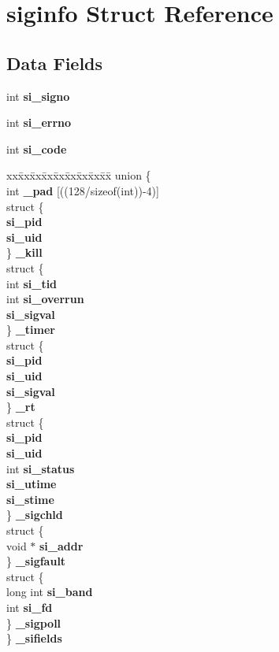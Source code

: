 \section{siginfo Struct Reference}
\label{structsiginfo}
\subsection*{Data Fields}
\begin{DoxyCompactItemize}
\item 
int {\bf si\_\-signo}
\item 
int {\bf si\_\-errno}
\item 
int {\bf si\_\-code}
\item 
\begin{tabbing}
xx\=xx\=xx\=xx\=xx\=xx\=xx\=xx\=xx\=\kill
union \{\\
\>int {\bf \_pad} [((128/sizeof(int))-\/4)]\\
\>struct \{\\
\> {\bf si\_pid}\\
\> {\bf si\_uid}\\
\>\} {\bf \_kill}\\
\>struct \{\\
\>\>int {\bf si\_tid}\\
\>\>int {\bf si\_overrun}\\
\> {\bf si\_sigval}\\
\>\} {\bf \_timer}\\
\>struct \{\\
\> {\bf si\_pid}\\
\> {\bf si\_uid}\\
\> {\bf si\_sigval}\\
\>\} {\bf \_rt}\\
\>struct \{\\
\> {\bf si\_pid}\\
\> {\bf si\_uid}\\
\>\>int {\bf si\_status}\\
\> {\bf si\_utime}\\
\> {\bf si\_stime}\\
\>\} {\bf \_sigchld}\\
\>struct \{\\
\>\>void $\ast$ {\bf si\_addr}\\
\>\} {\bf \_sigfault}\\
\>struct \{\\
\>\>long int {\bf si\_band}\\
\>\>int {\bf si\_fd}\\
\>\} {\bf \_sigpoll}\\
\} {\bf \_sifields}\\


\end{tabbing}
\end{DoxyCompactItemize}
